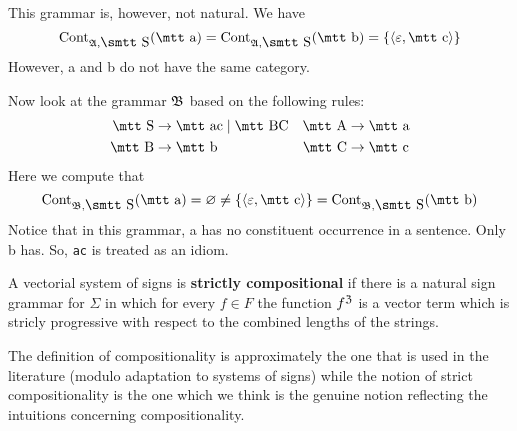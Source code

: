 This grammar is, however, not natural. We have 
\begin{equation}
\Cont_{\GA, \mbox{\smtt S}}(\mbox{\mtt a}) = 
	\Cont_{\GA, \mbox{\smtt S}}(\mbox{\mtt b}) = 
\{\auf \varepsilon, \mbox{\mtt c}\zu\} 
\end{equation}
However, {\mtt a} and {\mtt b} do not have the same category.

Now look at the grammar $\mathfrak{B}$ based on the following rules: 
\begin{align}
\mbox{\mtt S} & \pf \mbox{\mtt ac} \mid \mbox{\mtt BC} &
\mbox{\mtt A} & \pf \mbox{\mtt a} \\\notag
\mbox{\mtt B} & \pf \mbox{\mtt b} &
\mbox{\mtt C} & \pf \mbox{\mtt c}
\end{align}
Here we compute that 
\begin{equation}
\Cont_{\GB, \mbox{\smtt S}}(\mbox{\mtt a}) = \varnothing \neq 
\{\auf \varepsilon, \mbox{\mtt c}\zu\} = 
\Cont_{\GB, \mbox{\smtt S}}(\mbox{\mtt b}) 
\end{equation}
Notice that in this grammar, {\mtt a} has no constituent occurrence 
in a sentence. Only {\mtt b} has. So, {\tt ac} is treated as an idiom.  
\begin{defn}
A vectorial system of signs is \textbf{strictly compositional} 
if there is a natural sign grammar for $\Sigma$ in which for 
every $f \in F$ the function $f^{\mathfrak{Z}}$ is a vector term which 
is stricly progressive with respect to the combined lengths of 
the strings.
\end{defn}
The definition of compositionality is approximately the one that
is used in the literature (modulo adaptation to systems of signs)
while the notion of strict compositionality is the one which we
think is the genuine notion reflecting the intuitions concerning 
compositionality. 

